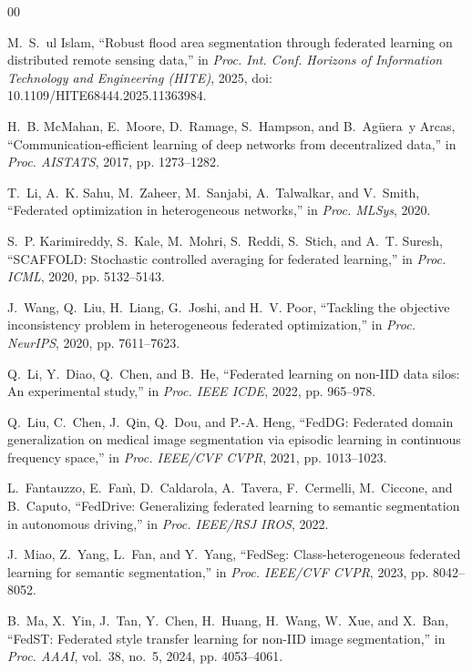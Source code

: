 \documentclass[conference]{IEEEtran}
\begin{document}

\begin{thebibliography}{00}

M.~S.~ul Islam, ``Robust flood area segmentation through federated learning on distributed remote sensing data,'' in \emph{Proc. Int. Conf. Horizons of Information Technology and Engineering (HITE)}, 2025, doi: 10.1109/HITE68444.2025.11363984.

H.~B. McMahan, E.~Moore, D.~Ramage, S.~Hampson, and B.~Ag{\"u}era~y Arcas, ``Communication-efficient learning of deep networks from decentralized data,'' in \emph{Proc. AISTATS}, 2017, pp. 1273--1282.

T.~Li, A.~K. Sahu, M.~Zaheer, M.~Sanjabi, A.~Talwalkar, and V.~Smith, ``Federated optimization in heterogeneous networks,'' in \emph{Proc. MLSys}, 2020.

S.~P. Karimireddy, S.~Kale, M.~Mohri, S.~Reddi, S.~Stich, and A.~T. Suresh, ``SCAFFOLD: Stochastic controlled averaging for federated learning,'' in \emph{Proc. ICML}, 2020, pp. 5132--5143.

J.~Wang, Q.~Liu, H.~Liang, G.~Joshi, and H.~V. Poor, ``Tackling the objective inconsistency problem in heterogeneous federated optimization,'' in \emph{Proc. NeurIPS}, 2020, pp. 7611--7623.

Q.~Li, Y.~Diao, Q.~Chen, and B.~He, ``Federated learning on non-IID data silos: An experimental study,'' in \emph{Proc. IEEE ICDE}, 2022, pp. 965--978.

Q.~Liu, C.~Chen, J.~Qin, Q.~Dou, and P.-A. Heng, ``FedDG: Federated domain generalization on medical image segmentation via episodic learning in continuous frequency space,'' in \emph{Proc. IEEE/CVF CVPR}, 2021, pp. 1013--1023.

L.~Fantauzzo, E.~Fan{\`\i}, D.~Caldarola, A.~Tavera, F.~Cermelli, M.~Ciccone, and B.~Caputo, ``FedDrive: Generalizing federated learning to semantic segmentation in autonomous driving,'' in \emph{Proc. IEEE/RSJ IROS}, 2022.

J.~Miao, Z.~Yang, L.~Fan, and Y.~Yang, ``FedSeg: Class-heterogeneous federated learning for semantic segmentation,'' in \emph{Proc. IEEE/CVF CVPR}, 2023, pp. 8042--8052.

B.~Ma, X.~Yin, J.~Tan, Y.~Chen, H.~Huang, H.~Wang, W.~Xue, and X.~Ban, ``FedST: Federated style transfer learning for non-IID image segmentation,'' in \emph{Proc. AAAI}, vol.~38, no.~5, 2024, pp. 4053--4061.


\end{thebibliography}
\end{document}
